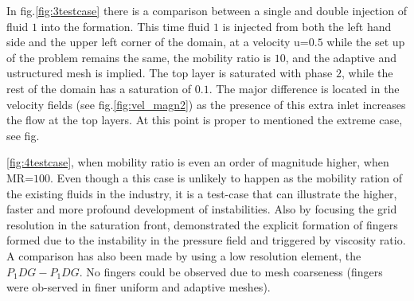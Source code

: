 \documentclass[preprint,authoryear,12pt]{elsarticle}
\begin{document}
In fig.\ref{fig:3testcase} there is a comparison between a single and double injection of fluid $1$ into the formation. This time fluid $1$ is injected from both the left hand side and the upper left corner of the domain, at a velocity u=$0.5$ while the set up of the problem remains the same, the mobility ratio is $10$, and the adaptive and ustructured mesh is implied. The top layer is saturated with phase $2$, while the rest of the domain has a saturation of $0.1$. The major difference is located in the velocity fields (see fig.\ref{fig:vel_magn2}) as the presence of this extra inlet increases the flow at the top layers. At this point is proper to mentioned the extreme case, see fig.{\ref{fig:4testcase}, when mobility ratio is even an order of magnitude higher, when MR=$100$. Even though a this case is unlikely to happen as the mobility ration of the existing fluids in the industry, it is a test-case that can illustrate the higher, faster and more profound development of instabilities. Also by focusing the grid resolution in the saturation front, \citet{christou2015}  demonstrated the explicit formation of ﬁngers formed due to the instability in the pressure ﬁeld and triggered by viscosity ratio. A comparison has also been made by using a low resolution element, the $P_{1}DG-P_{1}DG$. No ﬁngers could be observed due to mesh coarseness (ﬁngers were ob-served in ﬁner uniform and adaptive meshes). 



}
\end{document}
